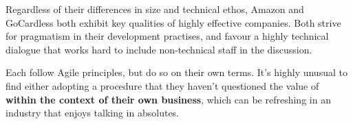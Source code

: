 \documentclass[11pt]{article}
\begin{document}
Regardless of their differences in size and technical ethos, Amazon and
GoCardless both exhibit key qualities of highly effective companies. Both strive
for pragmatism in their development practises, and favour a highly technical
dialogue that works hard to include non-technical staff in the discussion.

Each follow Agile principles, but do so on their own terms. It's highly unusual
to find either adopting a procedure that they haven't questioned the value of
\textbf{within the context of their own business}, which can be refreshing in an
industry that enjoys talking in absolutes.



\medskip
{}

\newpage
\end{document}
